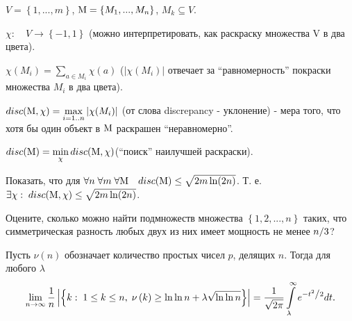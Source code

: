 \begin{problem}
$V=\left\{ {1,...,m} \right\}$, ${\rm M}=\left\{ {M_1 
,...,M_n } \right\}$, $M_k \subseteq V$.

$\chi :\quad V\to \left\{ {-1,1} \right\}$ (можно интерпретировать, как 
раскраску множества V в два цвета).

$\chi (M_i )=\sum\limits_{a\in M_i } {\chi (a)} $ ($\left| {\chi (M_i )} 
\right|$ отвечает за ``равномерность'' покраски множества $M_i $ в два 
цвета).

$disc({\rm M},\chi )=\mathop {\max }\limits_{i=1..n} \left| {\chi (M_i )} 
\right|$ (от слова discrepancy - уклонение) - мера того, что хотя бы один 
объект в ${\rm M}$ раскрашен ``неравномерно''.

$disc({\rm M})=\mathop {\min }\limits_\chi disc({\rm M},\chi )$(``поиск'' 
наилучшей раскраски).

Показать, что для $\forall n\;\forall m\;\forall {\rm M} \quad disc({\rm M})\le 
\sqrt {2m\ln (2n)} $. Т. е. $\exists \chi :\;disc({\rm M},\chi )\le \sqrt 
{2m\ln (2n)} $.

\end{problem}


\begin{problem}
Оцените, сколько можно найти подмножеств множества 
$\left\{ {1,2,...,n} \right\}$ таких, что симметрическая разность любых двух 
из них имеет мощность не менее $n \mathord{\left/ {\vphantom {n 3}} \right. 
\kern-\nulldelimiterspace} 3$?
\end{problem}



\begin{problem}
Пусть $\nu \left( n \right)$ 
обозначает количество простых чисел $p$, делящих $n$. Тогда для любого 
$\lambda $
\[
\mathop {\lim }\limits_{n\to \infty } \frac{1}{n}\left| {\left\{ {k:\;1\le 
k\le n,\;\nu \left( k \right)\ge \ln \ln n+\lambda \sqrt {\ln \ln n} } 
\right\}} \right|=\frac{1}{\sqrt {2\pi } }\int\limits_\lambda ^\infty 
{e^{-{t^2} \mathord{\left/ {\vphantom {{t^2} 2}} \right. 
\kern-\nulldelimiterspace} 2}dt} .
\]
\end{problem}










